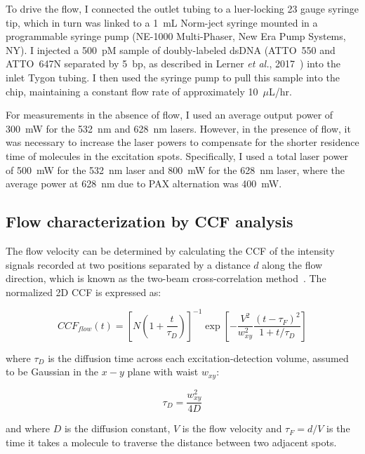 To drive the flow, I connected the outlet tubing to a luer-locking 23 gauge syringe tip, which in turn was linked to a 1~mL Norm-ject syringe mounted in a programmable syringe pump (NE-1000 Multi-Phaser, New Era Pump Systems, NY). 
I injected a 500~pM sample of doubly-labeled dsDNA (ATTO~550 and ATTO~647N separated by 5~bp, as described in Lerner \textit{et al.}, 2017~\cite{lerner_transcription_2017}) into the inlet Tygon tubing. 
I then used the syringe pump to pull this sample into the chip, maintaining a constant flow rate of approximately 10~$\mu$L/hr.

For measurements in the absence of flow, I used an average output power of 300~mW for the 532~nm and 628~nm lasers. 
However, in the presence of flow, it was necessary to increase the laser powers to compensate for the shorter residence time of molecules in the excitation spots. 
Specifically, I used a total laser power of 500~mW for the 532~nm laser and 800~mW for the 628~nm laser, where the average power at 628~nm due to \ac{PAX} alternation was 400~mW. 

\subsection{Flow characterization by CCF analysis}
\label{sec:microfluidics_CCF}

The flow velocity can be determined by calculating the \ac{CCF} of the intensity signals recorded at two positions separated by a distance $d$ along the flow direction, which is known as the two-beam cross-correlation method~\cite{brinkmeier_AC_1999}. 
The normalized 2D \ac{CCF} is expressed as:

\begin{equation}
\label{eqn:CCF_flow}
CCF_{flow}(t) = \left[N \left(1+\frac{t}{\tau_D} \right) \right]^{-1}
\exp \left[ -\frac{V^2}{w_{xy}^2}\frac{\left(t - \tau_F\right)^2}{1+t/\tau_D}\right] 
\end{equation}

\noindent
where $\tau_D$ is the diffusion time across each excitation-detection volume,
assumed to be Gaussian in the $x-y$ plane with waist $w_{xy}$:

\begin{equation}
    \label{eqn:tau_d}
    \tau_D = \frac{w_{xy}^2}{4D}
\end{equation}

\noindent
and where $D$ is the diffusion constant, $V$ is the flow velocity and $\tau_F = d/V$ is the time it takes a molecule to traverse the distance between two adjacent spots.

